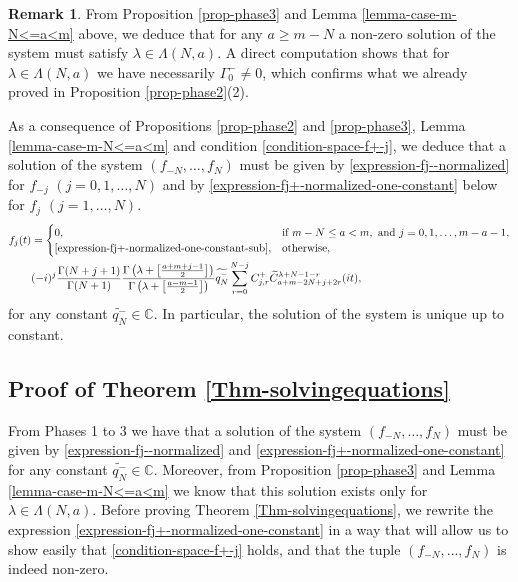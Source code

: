 \documentclass[12pt, pdflatex, a4paper]{article}
\theoremstyle{plain}
\theoremstyle{definition}
\newtheorem{rem}[thm]{Remark}
\def\C{{\mathbb C}}
\def\Geg{\widetilde{C}}
\begin{document}
\begin{rem}\label{rem-lambda_Gamma0-}
From Proposition \ref{prop-phase3} and Lemma \ref{lemma-case-m-N<=a<m} above, we deduce that for any $a \geq m-N$ a non-zero solution of the system must satisfy $\lambda \in \Lambda(N,a)$. A direct computation shows that for $\lambda \in \Lambda(N,a)$ we have necessarily $\Gamma_0^- \neq 0$, which confirms what we already proved in Proposition \ref{prop-phase2}(2).
\end{rem}

As a consequence of Propositions \ref{prop-phase2} and \ref{prop-phase3}, Lemma \ref{lemma-case-m-N<=a<m} and condition \eqref{condition-space-f+-j}, we deduce that a solution of the system $(f_{-N}, \ldots, f_N)$ must be given by \eqref{expression-fj--normalized} for $f_{-j}$ $(j = 0, 1, \ldots, N)$ and by \eqref{expression-fj+-normalized-one-constant} below for $f_j$ $(j = 1, \ldots, N)$.
\begin{align}
\label{expression-fj+-normalized-one-constant}
f_j(t) &= 
\begin{cases}
0, &\text{if } m-N\leq a < m, \text{ and } j = 0, 1, \ldots, m-a-1,\\
\eqref{expression-fj+-normalized-one-constant-sub}, & \text{otherwise},
\end{cases}\\
\label{expression-fj+-normalized-one-constant-sub}
&(-i)^j\frac{\Gamma(N+j+1)}{\Gamma(N+1)}\frac{\Gamma\left(\lambda+\left[\frac{a+m+j-1}{2}\right]\right)}{\Gamma\left(\lambda+\left[\frac{a-m-1}{2}\right]\right)}\widetilde{q_N^-}\sum_{r=0}^{N-j}C_{j,r}^+\Geg_{a+m-2N+j+2r}^{\lambda+N-1-r}(it),
\end{align}
for any constant $\widetilde{q_N^-} \in \C$. In particular, the solution of the system is unique up to constant.


\subsection{Proof of Theorem \ref{Thm-solvingequations}}
\label{section-proof_of_solving_equations-subsection}
From Phases 1 to 3 we have that a solution of the system $(f_{-N}, \ldots, f_N)$ must be given by \eqref{expression-fj--normalized} and \eqref{expression-fj+-normalized-one-constant} for any constant $\widetilde{q_N^-} \in \C$. Moreover, from Proposition \ref{prop-phase3} and Lemma \ref{lemma-case-m-N<=a<m} we know that this solution exists only for $\lambda \in \Lambda(N,a)$. Before proving Theorem \ref{Thm-solvingequations}, we rewrite the expression \eqref{expression-fj+-normalized-one-constant} in a way that will allow us to show easily that \eqref{condition-space-f+-j} holds, and that the tuple $(f_{-N}, \ldots, f_N)$ is indeed non-zero.
\end{document}
